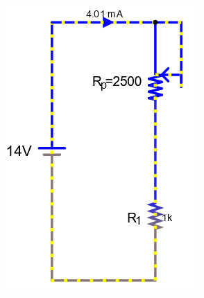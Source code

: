 \documentclass[a4paper]{article}
\begin{document}
\begin{figure}[H]
\begin{subfigure}{0.333\textwidth}
        \includegraphics[width=.9\linewidth]{amp14}
    \end{subfigure}
    \begin{subfigure}{0.333\textwidth}

\end{subfigure}
\end{figure}
\end{document}
